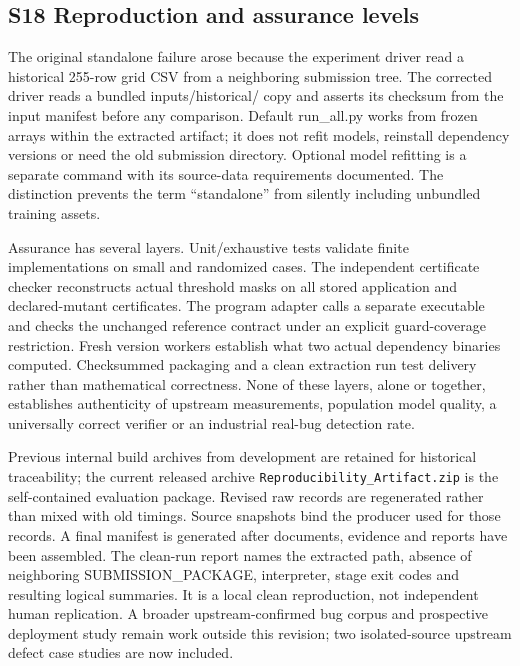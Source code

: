 \documentclass[11pt,a4paper]{article}
\theoremstyle{plain}
\theoremstyle{definition}
\theoremstyle{remark}
\begin{document}
\subsection*{S18 Reproduction and assurance levels}\label{sec:s18}

The original standalone failure arose because the experiment driver read a historical 255-row grid CSV from a neighboring submission tree. The corrected driver reads a bundled inputs/historical/ copy and asserts its checksum from the input manifest before any comparison. Default run\_all.py works from frozen arrays within the extracted artifact; it does not refit models, reinstall dependency versions or need the old submission directory. Optional model refitting is a separate command with its source-data requirements documented. The distinction prevents the term “standalone” from silently including unbundled training assets.

Assurance has several layers. Unit/exhaustive tests validate finite implementations on small and randomized cases. The independent certificate checker reconstructs actual threshold masks on all stored application and declared-mutant certificates. The program adapter calls a separate executable and checks the unchanged reference contract under an explicit guard-coverage restriction. Fresh version workers establish what two actual dependency binaries computed. Checksummed packaging and a clean extraction run test delivery rather than mathematical correctness. None of these layers, alone or together, establishes authenticity of upstream measurements, population model quality, a universally correct verifier or an industrial real-bug detection rate.

Previous internal build archives from development are retained for historical traceability; the current released archive \texttt{Reproducibility\_Artifact.zip} is the self-contained evaluation package. Revised raw records are regenerated rather than mixed with old timings. Source snapshots bind the producer used for those records. A final manifest is generated after documents, evidence and reports have been assembled. The clean-run report names the extracted path, absence of neighboring SUBMISSION\_PACKAGE, interpreter, stage exit codes and resulting logical summaries. It is a local clean reproduction, not independent human replication. A broader upstream-confirmed bug corpus and prospective deployment study remain work outside this revision; two isolated-source upstream defect case studies are now included.
\end{document}
